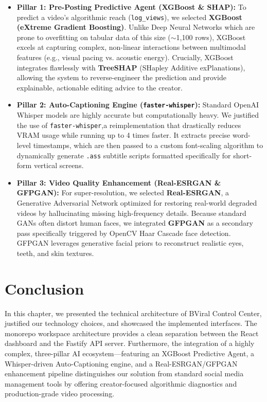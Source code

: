\begin{itemize}
    \item \textbf{Pillar 1: Pre-Posting Predictive Agent (XGBoost \& SHAP):} 
    To predict a video's algorithmic reach (\texttt{log\_views}), we selected \textbf{XGBoost (eXtreme Gradient Boosting)}. Unlike Deep Neural Networks which are prone to overfitting on tabular data of this size ($\sim$1,100 rows), XGBoost excels at capturing complex, non-linear interactions between multimodal features (e.g., visual pacing vs. acoustic energy). Crucially, XGBoost integrates flawlessly with \textbf{TreeSHAP} (SHapley Additive exPlanations), allowing the system to reverse-engineer the prediction and provide explainable, actionable editing advice to the creator.
    
    \item \textbf{Pillar 2: Auto-Captioning Engine (\texttt{faster-whisper}):}
    Standard OpenAI Whisper models are highly accurate but computationally heavy. We justified the use of \texttt{faster-whisper},a reimplementation that drastically reduces VRAM usage while running up to 4 times faster. It extracts precise word-level timestamps, which are then passed to a custom font-scaling algorithm to dynamically generate \texttt{.ass} subtitle scripts formatted specifically for short-form vertical screens.
    
    \item \textbf{Pillar 3: Video Quality Enhancement (Real-ESRGAN \& GFPGAN):}
    For super-resolution, we selected \textbf{Real-ESRGAN}, a Generative Adversarial Network optimized for restoring real-world degraded videos by hallucinating missing high-frequency details. Because standard GANs often distort human faces, we integrated \textbf{GFPGAN} as a secondary pass specifically triggered by OpenCV Haar Cascade face detection. GFPGAN leverages generative facial priors to reconstruct realistic eyes, teeth, and skin textures.
\end{itemize}



\section*{Conclusion}

In this chapter, we presented the technical architecture of BViral Control Center, justified our technology choices, and showcased the implemented interfaces. The monorepo workspace architecture provides a clean separation between the React dashboard and the Fastify API server. Furthermore, the integration of a highly complex, three-pillar AI ecosystem—featuring an XGBoost Predictive Agent, a Whisper-driven Auto-Captioning engine, and a Real-ESRGAN/GFPGAN enhancement pipeline distinguishes our solution from standard social media management tools by offering creator-focused algorithmic diagnostics and production-grade video processing.

{}



